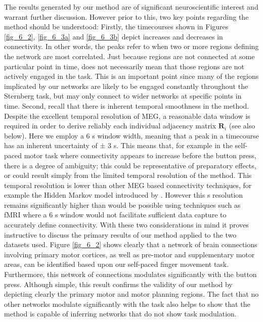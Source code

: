 The results generated by our method are of significant neuroscientific interest and warrant further discussion. However prior to this, two key points regarding the method should be understood: Firstly, the timecourses shown in Figures \ref{fig_6_2}, \ref{fig_6_3a} and \ref{fig_6_3b} depict increases and decreases in connectivity. In other words, the peaks refer to when two or more regions defining the network are most correlated. Just because regions are not connected at some particular point in time, does not necessarily mean that those regions are not actively engaged in the task. This is an important point since many of the regions implicated by our networks are likely to be engaged constantly throughout the Sternberg task, but may only connect to wider networks at specific points in time. Second, recall that there is inherent temporal smoothness in the method. Despite the excellent temporal resolution of MEG, a reasonable data window is required in order to derive reliably each individual adjacency matrix $\mathbf{R}_i$ (see also below). Here we employ a 6 s window width, meaning that a peak in a timecourse has an inherent uncertainty of ± 3 s. This means that, for example in the self-paced motor task where connectivity appears to increase before the button press, there is a degree of ambiguity; this could be representative of preparatory effects, or could result simply from the limited temporal resolution of the method. This temporal resolution is lower than other MEG based connectivity techniques, for example the Hidden Markov model introduced by \cite{Baker2014}. However this  s resolution remains significantly higher than would be possible using techniques such as fMRI where a 6 s window would not facilitate sufficient data capture to accurately define connectivity. With these two considerations in mind it proves instructive to discuss the primary results of our method applied to the two datasets used. Figure \ref{fig_6_2} shows clearly that a network of brain connections involving primary motor cortices, as well as pre-motor and supplementary motor areas, can be identified based upon our self-paced finger movement task. Furthermore, this network of connections modulates significantly with the button press. Although simple, this result confirms the validity of our method by depicting clearly the primary motor and motor planning regions. The fact that no other networks modulate significantly with the task also helps to show that the method is capable of inferring networks that do not show task modulation. 

